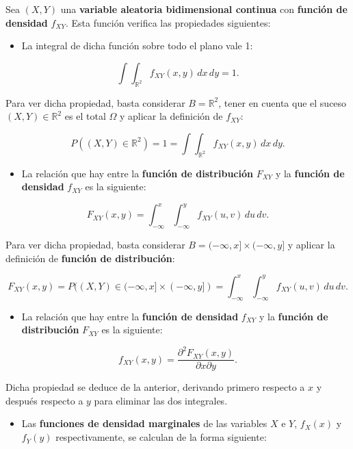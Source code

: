 \documentclass[]{book}
\providecommand{\tightlist}{%
  \setlength{\itemsep}{0pt}\setlength{\parskip}{0pt}}
\begin{document}
Sea \((X,Y)\) una \textbf{variable aleatoria bidimensional continua} con \textbf{función de densidad} \(f_{XY}\). Esta función verifica las propiedades siguientes:

\begin{itemize}
\tightlist
\item
  La integral de dicha función sobre todo el plano vale 1:
\end{itemize}

\[
\int\int_{\mathbb{R}^2} f_{XY}(x,y)\,dx\,dy =1.
\]

Para ver dicha propiedad, basta considerar \(B=\mathbb{R}^2\), tener en cuenta que el suceso \((X,Y)\in \mathbb{R}^2\) es el total \(\Omega\) y aplicar la definición de \(f_{XY}\):

\[
P((X,Y)\in \mathbb{R}^2)=1= \int\int_{\mathbb{R}^2} f_{XY}(x,y)\,dx\,dy.
\]

\begin{itemize}
\tightlist
\item
  La relación que hay entre la \textbf{función de distribución} \(F_{XY}\) y la \textbf{función de densidad} \(f_{XY}\) es la siguiente:
\end{itemize}

\[
F_{XY}(x,y)=\int_{-\infty}^x\int_{-\infty}^y f_{XY}(u,v)\,du\,dv.
\]

Para ver dicha propiedad, basta considerar \(B=(-\infty,x]\times (-\infty,y]\) y aplicar la definición de \textbf{función de distribución}:

\[
F_{XY}(x,y)=P((X,Y)\in (-\infty,x]\times (-\infty,y])=\int_{-\infty}^x\int_{-\infty}^y f_{XY}(u,v)\,du\,dv.
\]

\begin{itemize}
\tightlist
\item
  La relación que hay entre la \textbf{función de densidad} \(f_{XY}\) y la \textbf{función de distribución} \(F_{XY}\) es la siguiente:
\end{itemize}

\[
f_{XY}(x,y)=\frac{\partial^2 F_{XY}(x,y)}{\partial x\partial y}.
\]

Dicha propiedad se deduce de la anterior, derivando primero respecto a \(x\) y después respecto a \(y\) para eliminar las dos integrales.

\begin{itemize}
\tightlist
\item
  Las \textbf{funciones de densidad marginales} de las variables \(X\) e \(Y\), \(f_X(x)\) y \(f_Y(y)\) respectivamente, se calculan de la forma siguiente:
\end{itemize}
\end{document}
